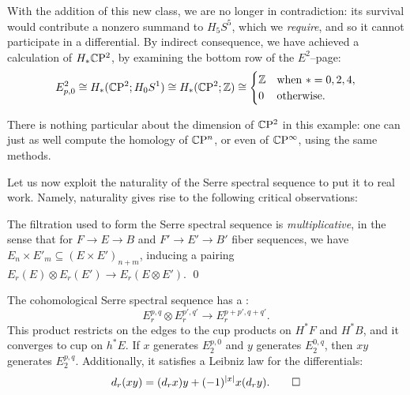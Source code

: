 \begin{example}
\noindent
With the addition of this new class, we are no longer in contradiction: its survival would contribute a nonzero summand to $H_5 S^5$, which we \emph{require}, and so it cannot participate in a differential.
By indirect consequence, we have achieved a calculation of $H_* \mathbb C \mathrm{P}^2$, by examining the bottom row of the $E^2$--page: \[E^2_{p, 0} \cong H_*(\mathbb C \mathrm{P}^2; H_0 S^1) \cong H_*(\mathbb C \mathrm{P}^2; \mathbb Z) \cong \begin{cases} \mathbb Z & \text{when $* = 0, 2, 4$}, \\ 0 & \text{otherwise}. \end{cases}\]

There is nothing particular about the dimension of $\mathbb C \mathrm{P}^2$ in this example: one can just as well compute the homology of $\mathbb C \mathrm{P}^n$, or even of $\mathbb C \mathrm{P}^\infty$, using the same methods.
\end{example}

Let us now exploit the naturality of the Serre spectral sequence to put it to real work.
Namely, naturality gives rise to the following critical observations:

\begin{lemma}
The filtration used to form the Serre spectral sequence is \emph{multiplicative}, in the sense that for $F \to E \to B$ and $F' \to E' \to B'$ fiber sequences, we have $E_n \times E'_m \subseteq (E \times E')_{n+m}$, inducing a pairing $E_r(E) \otimes E_r(E') \to E_r(E \otimes E')$.
\qed
\end{lemma}

\begin{corollary}\label{LeibinzInSSS}
The cohomological Serre spectral sequence has a : \[E_r^{p, q} \otimes E_r^{p', q'} \to E_r^{p+p', q+q'}.\]
This product restricts on the edges to the cup products on $H^* F$ and $H^* B$, and it converges to cup on $h^* E$.
If $x$ generates $E_2^{p, 0}$ and $y$ generates $E_2^{0, q}$, then $xy$ generates $E_2^{p, q}$.
Additionally, it satisfies a Leibniz law for the differentials: \[d_r(x y) = (d_r x) y + (-1)^{|x|} x (d_r y). \qed\]
\end{corollary}

